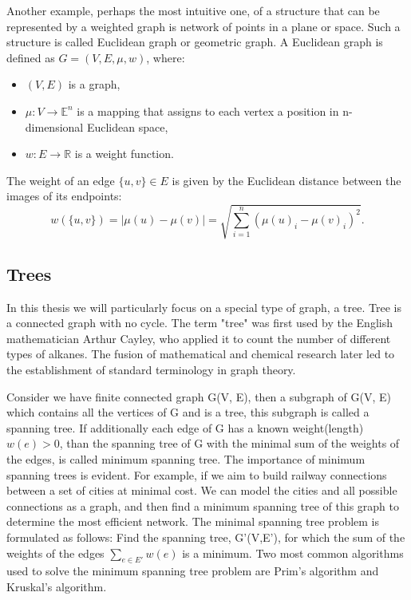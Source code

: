 \documentclass[12pt]{article}
\begin{document}
		Another example, perhaps the most intuitive one, of a structure that can be represented by a weighted graph is network of points in a plane or space. Such a structure is called Euclidean graph or geometric graph.
		A Euclidean graph is defined as \( G = (V, E, \mu, w) \), where:
		\begin{itemize}
			\item \( (V, E) \) is a graph,
			\item \( \mu : V \to \mathbb{E}^n \) is a mapping that assigns to each vertex a position in n-dimensional Euclidean space,
			\item \( w : E \to \mathbb{R} \) is a weight function.
		\end{itemize}
		The weight of an edge \( \{u,v\} \in E \) is given by the Euclidean distance between the images of its endpoints:
		\[
		w(\{u,v\}) = |\mu(u) - \mu(v)| = \sqrt{ \sum_{i=1}^{n} (\mu(u)_i - \mu(v)_i)^2 }.
		\]
		
	\subsection{Trees}
		In this thesis we will particularly focus on a special type of graph, a tree.
		Tree is a connected graph with no cycle.
		The term "tree" was first used by the English mathematician Arthur Cayley, who applied it to count the number of different types of alkanes. The fusion of mathematical and chemical research later led to the establishment of standard terminology in graph theory.
		
		Consider we have finite connected graph G(V, E), then a subgraph of G(V, E) which contains all the vertices of G and is a tree, this subgraph is called a spanning tree. If additionally each edge of G has a known weight(length) \(w(e)>0\), than the spanning tree of G with the minimal sum of the weights of the edges, is called minimum spanning tree. The importance of minimum spanning trees is evident. For example, if we aim to build railway connections between a set of cities at minimal cost. We can model the cities and all possible connections as a graph, and then find a minimum spanning tree of this graph to determine the most efficient network. 
		The minimal spanning tree problem is formulated as follows: Find the spanning tree, G'(V,E'), for which the sum of the weights of the edges \( \sum_{e \in E'} w(e)\) is a minimum. Two most common algorithms used to solve the minimum spanning tree problem are Prim's algorithm and Kruskal's algorithm.
		
\end{document}
